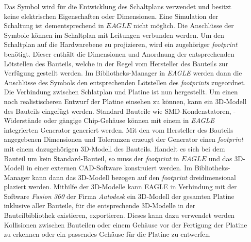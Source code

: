 Das Symbol wird für die Entwicklung des Schaltplans verwendet und besitzt keine elektrischen Eigenschaften oder Dimensionen. Eine Simulation der Schaltung ist dementsprechend in $EAGLE$ nicht möglich. Die Anschlüsse der Symbole können im Schaltplan mit Leitungen verbunden werden. Um den Schaltplan auf die Hardwarebene zu projizieren, wird ein zugehöriger \textit{footprint} benötigt. Dieser enthält die Dimensionen und Anordnung der entsprechenden Lötstellen des Bauteils, welche in der Regel vom Hersteller des Bauteils zur Verfügung gestellt werden. Im Bibliotheks-Manager in \textit{EAGLE} werden dann die Anschlüsse des Symbols den entsprechenden Lötstellen des \textit{footprints} zugeordnet. Die Verbindung zwischen Schlatplan und Platine ist nun hergestellt. Um  einen noch realistischeren Entwurf der Platine einsehen zu können, kann ein 3D-Modell des Bauteils eingefügt werden. Standard Bauteile wie SMD-Kondenstatoren, -Widerstände oder gängige Chip-Gehäuse können mit einem in \textit{EAGLE} integrierten Generator generiert werden. Mit den vom Hersteller des Bauteils angegebenen Dimensionen und Toleranzen erzeugt der Generator einen \textit{footprint} mit einem dazugehörigen 3D-Modell des Bauteils. Handelt es sich bei dem Bauteil um kein Standard-Bauteil, so muss der \textit{footprint} in $EAGLE$ und das 3D-Modell in einer externen CAD-Software konstruiert werden. Im Bibliotheks-Manager kann dann das 3D-Modell bezogen auf den \textit{footprint} dreidimensional plaziert werden. Mithilfe der 3D-Modelle kann EAGLE in Verbindung mit der Software \textit{Fusion 360} der Firma \textit{Autodesk} ein 3D-Modell der gesamten Platine inklusive aller Bauteile, für die entsprechende 3D-Modelle in der Bauteilbibliothek existieren, exportieren. Dieses kann dazu verwendet werden Kollisionen zwischen Bauteilen oder einem Gehäuse vor der Fertigung der Platine zu erkennen oder ein passendes Gehäuse für die Platine zu entwerfen.

